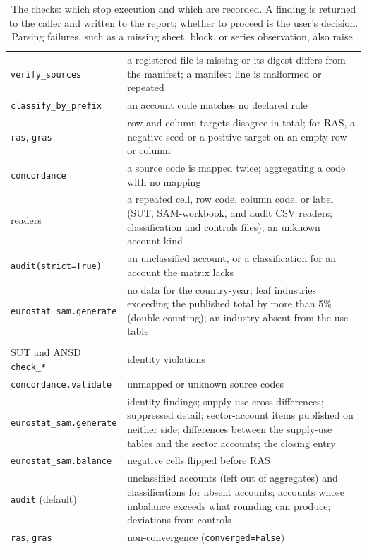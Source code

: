 \documentclass[11pt,a4paper]{article}
\begin{document}
\begin{table}[t]
\centering\small
\begin{tabularx}{\textwidth}{>{\raggedright\arraybackslash}p{}X}
\toprule
\multicolumn{2}{l}{\emph{Stops execution (raises)}} \\
\midrule
\texttt{verify\_sources} & a registered file is missing or its digest differs from the manifest; a manifest line is malformed or repeated \\
\texttt{classify\_by\_prefix} & an account code matches no declared rule \\
\texttt{ras}, \texttt{gras} & row and column targets disagree in total; for RAS, a negative seed or a positive target on an empty row or column \\
\texttt{concordance} & a source code is mapped twice; aggregating a code with no mapping \\
readers & a repeated cell, row code, column code, or label (SUT, SAM-workbook, and audit CSV readers; classification and controls files); an unknown account kind \\
\texttt{audit(strict=True)} & an unclassified account, or a classification for an account the matrix lacks \\
\texttt{eurostat\_sam.generate} & no data for the country-year; leaf industries exceeding the published total by more than 5\% (double counting); an industry absent from the use table \\
\midrule
\multicolumn{2}{l}{\emph{Recorded, execution continues}} \\
\midrule
SUT and ANSD \texttt{check\_*} & identity violations \\
\texttt{concordance.validate} & unmapped or unknown source codes \\
\texttt{eurostat\_sam.generate} & identity findings; supply-use cross-differences; suppressed detail; sector-account items published on neither side; differences between the supply-use tables and the sector accounts; the closing entry \\
\texttt{eurostat\_sam.balance} & negative cells flipped before RAS \\
\texttt{audit} (default) & unclassified accounts (left out of aggregates) and classifications for absent accounts; accounts whose imbalance exceeds what rounding can produce; deviations from controls \\
\texttt{ras}, \texttt{gras} & non-convergence (\texttt{converged=False}) \\
\bottomrule
\end{tabularx}
\caption{The checks: which stop execution and which are recorded. A
finding is returned to the caller and written to the report; whether to
proceed is the user's decision. Parsing failures, such as a missing sheet,
block, or series observation, also raise.}
\label{tab:checks}
\end{table}
\end{document}
